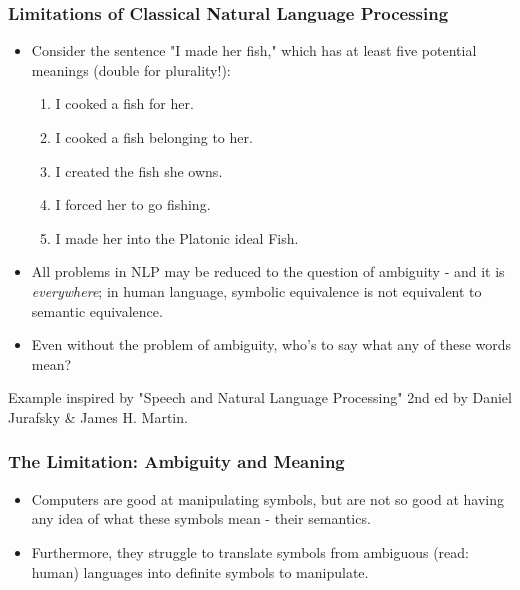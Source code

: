 \documentclass[aspectratio=169]{beamer} %
\begin{document}
\begin{frame}
\frametitle{Limitations of Classical Natural Language Processing}

\begin{itemize}
\item Consider the sentence "I made her fish," which has at least five potential
meanings (double for plurality!):

\begin{enumerate}
  \item I cooked a fish for her.
  \item I cooked a fish belonging to her.
  \item I created the fish she owns.
  \item I forced her to go fishing.
  \item I made her into the Platonic ideal Fish.
\end{enumerate}

\item All problems in NLP may be reduced to the question of ambiguity - and it is
\emph{everywhere}; in human language, symbolic equivalence is not equivalent to semantic equivalence.
\item Even without the problem of ambiguity, who's to say what any of these words mean?

\end{itemize}
\begin{minipage}[t][.2\textheight]{\textwidth}
\tiny{Example inspired by "Speech and Natural Language
Processing" 2nd ed by Daniel
Jurafsky \& James H. Martin.}
\vfill
\end{minipage}
\end{frame}

\begin{frame}
\frametitle{The Limitation: Ambiguity and Meaning}

\begin{itemize}
  \item Computers are good at manipulating symbols, but are not so good at
  having any idea of what these symbols mean - their semantics.
  \item Furthermore, they struggle to translate symbols from ambiguous (read:
  human) languages into definite symbols to manipulate.
\end{itemize}
\end{frame}
\end{document}

